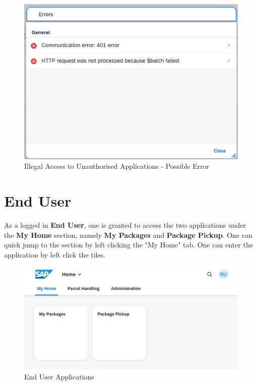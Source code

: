 \begin{figure}[H]
	\centering
	\includegraphics[width=1\linewidth]{images/user_doc/overviews/ConnectionError1.png}
	\caption{Illegal Access to Unauthorised Applications - Possible Error}
	\label{fig:IllegalAccesstoUnauthorised Applications}
\end{figure}

\pagebreak

\section{End User}

As a logged in \textbf{End User}, one is granted to access the two applications under the \textbf{My Home} section, namely \textbf{My Packages} and \textbf{Package Pickup}. One can quick jump to the section by left clicking the "My Home" tab. One can enter the application by left click the tiles.

\begin{figure}[H]
	\centering
	\includegraphics[width=1\linewidth]{images/user_doc/overviews/MyHomeTab.png}
	\caption{End User Applications}
	\label{fig:EndUserApplications}
\end{figure}



